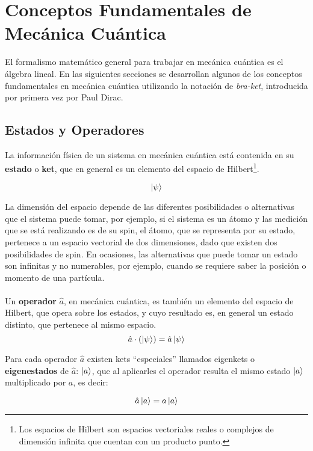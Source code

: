 \chapter{Conceptos Fundamentales de Mecánica Cuántica}\label{ch:2}

El formalismo matemático general para trabajar en  mecánica cuántica es el álgebra lineal. En las siguientes secciones se desarrollan algunos de los conceptos fundamentales en mecánica cuántica utilizando la notación de \emph{bra-ket}, introducida por primera vez por Paul Dirac.

\section{Estados y Operadores}\label{sec:Estados y Operadores}
La información física de un sistema en mecánica cuántica está contenida en su \textbf{estado} o \textbf{ket}, que en general es un elemento del espacio de Hilbert\footnote{Los espacios de Hilbert son espacios vectoriales reales o complejos de dimensión infinita que cuentan con un producto punto.}.

\[
\ket{\psi}
\]

La dimensión del espacio depende de las diferentes posibilidades o alternativas que el sistema puede tomar, por ejemplo, si el sistema es un átomo y las medición que se está realizando es de su spin, el átomo, que se representa por su estado, pertenece a un espacio vectorial de dos dimensiones, dado que existen dos posibilidades de spin. En ocasiones, las alternativas que puede tomar un estado son infinitas y no numerables, por ejemplo, cuando se requiere saber la posición o momento de una partícula.
\\
\\
Un \textbf{operador} $\hat{a}$, en mecánica cuántica, es también un elemento del espacio de Hilbert, que opera sobre los estados, y cuyo resultado es, en general un estado distinto, que pertenece al mismo espacio.
\[
\hat{a} \cdot (\ket{\psi}) = \hat{a}\ket{\psi}
\]

Para cada operador $\hat{a}$ existen kets ``especiales'' llamados eigenkets o \textbf{eigenestados} de $\hat{a}$: $\ket{a}$, que al aplicarles el operador resulta el mismo estado $\ket{a}$ multiplicado por $a$, es decir:

\[ \hat{a}\ket{a} = a\ket{a}\]

